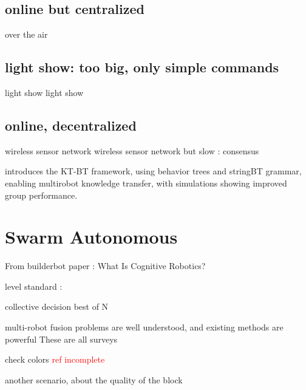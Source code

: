 \subsection {online but centralized}
\cite{zyrianoff2024over} over the air
\cite{abadie2024robotap}

\subsection {light show: too big, only simple commands}
\cite{waibel2017drone} light show
\cite{ang2018high} light show

\subsection {online, decentralized}
\cite{xie2011design} wireless sensor network
\cite{wang2006reprogramming} wireless sensor network
but slow : consensus
\cite{de2009energy}
\cite{varadharajan2018over} 

\cite{venkata2023kt} introduces the KT-BT framework, using behavior trees and stringBT grammar, enabling multirobot knowledge transfer, with simulations showing improved group performance.

\section{Swarm Autonomous}

From builderbot paper :
What Is Cognitive Robotics?
\cite{cangelosi2022cognition} 
\cite{vernon2014artificial} 
\cite{heinrich2022swarm}
\cite{khaluf2019neglected}

level standard :
\cite{sae2021automated}

collective decision
\cite{valentini2017best} best of N
\cite{dorigo2014self}
\cite{valentini2016collective}

multi-robot fusion problems are well understood, and existing methods are powerful
These are all surveys
\cite{yan2013survey} 
\cite{sun2017multi}
\cite{rizk2019cooperative}
\cite{li2021multi}

check colors
\cite{strobel2018managing} \textcolor{red}{ref incomplete}
\cite{ebert2018multi}
\cite{shan2020collective}
\cite{bartashevich2019benchmarking}
\cite{shan2021discrete}

another scenario, about the quality of the block
\cite{prasetyo2018best}
\cite{prasetyo2019collective}
\cite{khaluf2017edge} 
\cite{wahby2019collective}
\cite{khaluf2020construction}
\cite{capitan2013decentralized}

